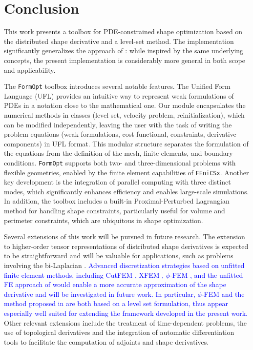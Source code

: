 \documentclass[preprint,9pt]{elsarticle}
\newcommand{\blue}{\textcolor{blue}}
\begin{document}
\section{Conclusion}

This work presents a toolbox for PDE-constrained shape optimization
based on the distributed shape derivative and a level-set method.
The implementation significantly generalizes
the approach of \cite{MR3843884}:
while inspired by the same underlying concepts,
the present implementation is considerably
more general in both scope and applicability.

The \texttt{FormOpt} toolbox introduces several notable features.
The Unified Form Language (UFL) provides an intuitive way
to represent weak formulations of PDEs in a notation
close to the mathematical one. 
Our module encapsulates the numerical methods in classes
(level set, velocity problem, reinitialization),
which can be modified independently,
leaving the user with the task of writing the problem equations
(weak formulations, cost functional, constraints, derivative components)
in UFL format.
This modular structure separates the formulation of the equations
from the definition of the mesh, finite elements, and boundary conditions.
\texttt{FormOpt}  supports both two- and three-dimensional problems with
flexible geometries, enabled by the finite element capabilities
of \texttt{FEniCSx}. Another key development is the integration of
parallel computing with three distinct modes,
which significantly enhances efficiency and enables
large-scale simulations. In addition,
the toolbox includes a built-in Proximal-Perturbed Lagrangian method
for handling shape constraints, particularly useful for volume
and perimeter constraints, which are ubiquitous in shape optimization.

Several extensions of this work will be pursued in future research.
The extension to higher-order tensor representations of
distributed shape derivatives is expected to be straightforward
and will be valuable for applications, such as problems
involving the bi-Laplacian \citep{LL2024}.
%
\blue{	Advanced discretization strategies based on unfitted finite element
	methods, including CutFEM \citep{MR3416285}, XFEM
	\citep{belytschko2001arbitrary}, $\phi$-FEM \cite{Duprez1}, and the unfitted FE approach of \cite{ShahanWalker} would
	enable a more accurate approximation of the shape derivative and will
	be investigated in future work. In particular, $\phi$-FEM \cite{Duprez1}
	and the method proposed in \cite{ShahanWalker} are both based on a level
	set formulation, thus appear especially well suited for extending the
	framework developed in the present work.}
Other relevant extensions include the treatment of
time-dependent problems, the use of topological derivatives
\citep{MR4916810,MR3013681} and the integration of automatic
differentiation tools
\citep{Allaire2024,BLAUTH2023101577,MR4233697,MR4034755,MR4244971}
to facilitate the computation of adjoints and shape derivatives.
\end{document}
